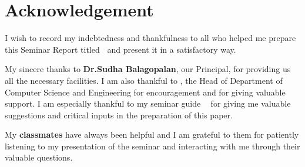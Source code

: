 %
\chapter*{Acknowledgement}
%
I wish to record my indebtedness and thankfulness 
to all who helped me prepare this Seminar Report titled 
\textbf{\vtitle\  }and present it in a satisfactory way. 

My sincere thanks to \textbf{Dr.Sudha Balagopalan}, our Principal, for providing us all the necessary facilities.
I am also thankful to \textbf{\vhod}, 
the Head of Department of Computer Science and Engineering 
for encouragement and for giving valuable 
support.
I am especially thankful to my seminar 
guide \textbf{\vguide\ }  
for giving me valuable suggestions and 
critical inputs in the preparation of this paper. 

My \textbf{classmates} have always been 
helpful and I am grateful to them for 
patiently listening to  my presentation of the seminar and interacting with me through their valuable questions. 


